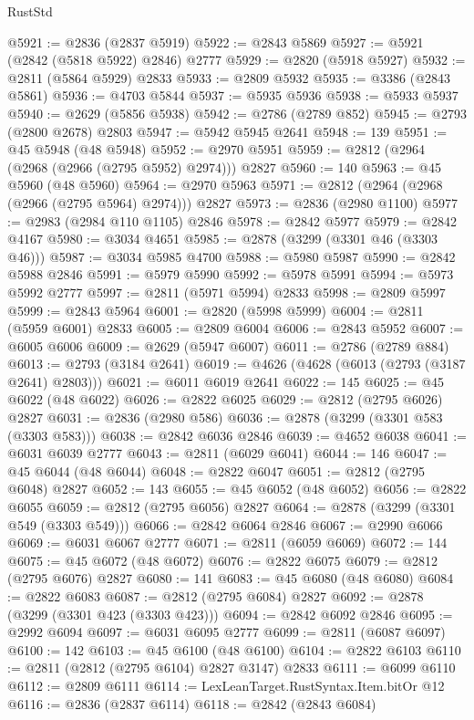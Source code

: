 \begin{lexlean}{RustStd}
\begin{coremodule}
{\begin{coremodule}
{{{{{{{{{{{{{{{{{{{{{{{{{{{{{{{{{@5921 := @2836 (@2837 @5919)
@5922 := @2843 @5869
@5927 := @5921 (@2842 (@5818 @5922) @2846) @2777
@5929 := @2820 (@5918 @5927)
@5932 := @2811 (@5864 @5929) @2833
@5933 := @2809 @5932
@5935 := @3386 (@2843 @5861)
@5936 := @4703 @5844
@5937 := @5935 @5936
@5938 := @5933 @5937
@5940 := @2629 (@5856 @5938)
@5942 := @2786 (@2789 @852)
@5945 := @2793 (@2800 @2678) @2803
@5947 := @5942 @5945 @2641
@5948 := 139
@5951 := @45 @5948 (@48 @5948)
@5952 := @2970 @5951
@5959 := @2812 (@2964 (@2968 (@2966 (@2795 @5952) @2974))) @2827
@5960 := 140
@5963 := @45 @5960 (@48 @5960)
@5964 := @2970 @5963
@5971 := @2812 (@2964 (@2968 (@2966 (@2795 @5964) @2974))) @2827
@5973 := @2836 (@2980 @1100)
@5977 := @2983 (@2984 @110 @1105) @2846
@5978 := @2842 @5977
@5979 := @2842 @4167
@5980 := @3034 @4651
@5985 := @2878 (@3299 (@3301 @46 (@3303 @46)))
@5987 := @3034 @5985 @4700
@5988 := @5980 @5987
@5990 := @2842 @5988 @2846
@5991 := @5979 @5990
@5992 := @5978 @5991
@5994 := @5973 @5992 @2777
@5997 := @2811 (@5971 @5994) @2833
@5998 := @2809 @5997
@5999 := @2843 @5964
@6001 := @2820 (@5998 @5999)
@6004 := @2811 (@5959 @6001) @2833
@6005 := @2809 @6004
@6006 := @2843 @5952
@6007 := @6005 @6006
@6009 := @2629 (@5947 @6007)
@6011 := @2786 (@2789 @884)
@6013 := @2793 (@3184 @2641)
@6019 := @4626 (@4628 (@6013 (@2793 (@3187 @2641) @2803)))
@6021 := @6011 @6019 @2641
@6022 := 145
@6025 := @45 @6022 (@48 @6022)
@6026 := @2822 @6025
@6029 := @2812 (@2795 @6026) @2827
@6031 := @2836 (@2980 @586)
@6036 := @2878 (@3299 (@3301 @583 (@3303 @583)))
@6038 := @2842 @6036 @2846
@6039 := @4652 @6038
@6041 := @6031 @6039 @2777
@6043 := @2811 (@6029 @6041)
@6044 := 146
@6047 := @45 @6044 (@48 @6044)
@6048 := @2822 @6047
@6051 := @2812 (@2795 @6048) @2827
@6052 := 143
@6055 := @45 @6052 (@48 @6052)
@6056 := @2822 @6055
@6059 := @2812 (@2795 @6056) @2827
@6064 := @2878 (@3299 (@3301 @549 (@3303 @549)))
@6066 := @2842 @6064 @2846
@6067 := @2990 @6066
@6069 := @6031 @6067 @2777
@6071 := @2811 (@6059 @6069)
@6072 := 144
@6075 := @45 @6072 (@48 @6072)
@6076 := @2822 @6075
@6079 := @2812 (@2795 @6076) @2827
@6080 := 141
@6083 := @45 @6080 (@48 @6080)
@6084 := @2822 @6083
@6087 := @2812 (@2795 @6084) @2827
@6092 := @2878 (@3299 (@3301 @423 (@3303 @423)))
@6094 := @2842 @6092 @2846
@6095 := @2992 @6094
@6097 := @6031 @6095 @2777
@6099 := @2811 (@6087 @6097)
@6100 := 142
@6103 := @45 @6100 (@48 @6100)
@6104 := @2822 @6103
@6110 := @2811 (@2812 (@2795 @6104) @2827 @3147) @2833
@6111 := @6099 @6110
@6112 := @2809 @6111
@6114 := LexLeanTarget.RustSyntax.Item.bitOr @12
@6116 := @2836 (@2837 @6114)
@6118 := @2842 (@2843 @6084)
}}}}}}}}}}}}}}}}}}}}}}}}}}}}}}}}}
\end{coremodule}}
\end{coremodule}
\end{lexlean}
